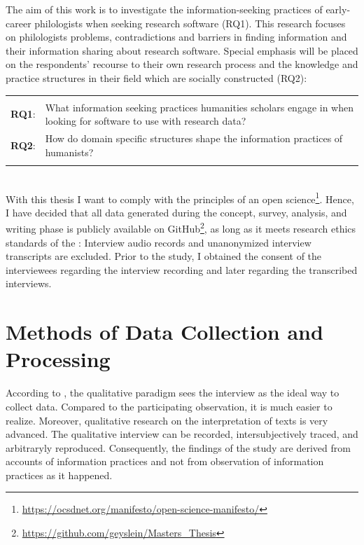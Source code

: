 \documentclass[12pt, a4paper, titlepage, oneside, abstract=true, toc=listof, toc=bibliography]{scrreprt}
\begin{document}
The aim of this work is to investigate the information-seeking practices of early-career philologists when seeking research software (RQ1). This research focuses on philologists problems, contradictions and barriers in finding information and their information sharing about research software. Special emphasis will be placed on the respondents' recourse to their own research process and the knowledge and practice structures in their field \citep{Hjorland1995} which are socially constructed (RQ2):

\begin{tabular}{p{2cm}p{12cm}}
& \\
\textbf{RQ1}: & What information seeking practices humanities scholars engage in when looking for software to use with research data? \\ 
\textbf{RQ2}: & How do domain specific structures shape the information practices of humanists? \\ 
& \\
\end{tabular}\\  

With this thesis I want to comply with the principles of an open science\footnote{\url{https://ocsdnet.org/manifesto/open-science-manifesto/}}. Hence, I have decided that all data generated during the concept, survey, analysis, and writing phase is publicly available on GitHub\footnote{\url{https://github.com/geyslein/Masters_Thesis}}, as long as it meets research ethics standards of the \citet{DeutscheForschungsgemeinschaft2019}: Interview audio records and unanonymized interview transcripts are excluded. Prior to the study, I obtained the consent of the interviewees regarding the interview recording and later regarding the transcribed interviews.

\section{Methods of Data Collection and Processing}
\label{sec:data_collection}
According to \citet[p. 329]{Lamnek2005}, the qualitative paradigm sees the interview as the ideal way to collect data. Compared to the participating observation, it is much easier to realize. Moreover, qualitative research on the interpretation of texts is very advanced. The qualitative interview can be recorded, intersubjectively traced, and arbitraryly reproduced. Consequently, the findings of the study are derived from accounts of information practices and not from observation of information practices as it happened. 
\end{document}
